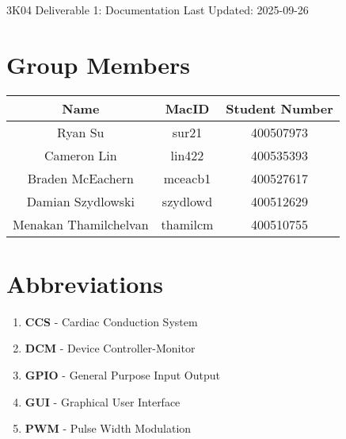 \documentclass{article}
\begin{document}

\begin{titlepage}
    \begin{center}
        \vspace*{1cm}
        \Huge
        3K04 Deliverable 1: Documentation
        \normalsize
        \vfill
        Last Updated: 2025-09-26
    \end{center}
 \end{titlepage}


\newpage
\tableofcontents


\newpage
{}
\listoffigures
{}

\listoftables
{}


\newpage
\section{Group Members}
\begin{tabular}{|c|c|c|}
    \hline
    Name        & MacID         & Student Number    \\
    \hline
    Ryan Su     & sur21         & 400507973         \\
    \hline
    Cameron Lin & lin422        & 400535393         \\
    \hline
    Braden McEachern & mceacb1  & 400527617 \\
    \hline
    Damian Szydlowski & szydlowd & 400512629 \\
    \hline
    Menakan Thamilchelvan & thamilcm & 400510755\\ 
    \hline
\end{tabular}

\newpage
\section{Abbreviations}
\begin{enumerate}[label=]
    \item \textbf{CCS} - Cardiac Conduction System
    \item \textbf{DCM} - Device Controller-Monitor
    \item \textbf{GPIO} - General Purpose Input Output
    \item \textbf{GUI} - Graphical User Interface
    \item \textbf{PWM} - Pulse Width Modulation
\end{enumerate}
\end{document}
